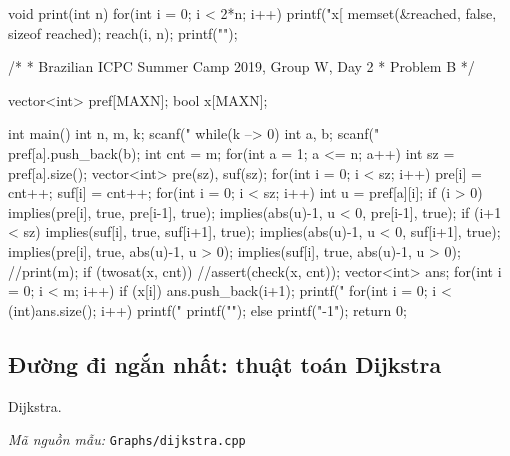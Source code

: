 \documentclass[11pt]{article}
\newcommand{\codepath}[1]{\par\noindent\textit{Mã nguồn mẫu:} \texttt{#1}\par}
\begin{document}
\begin{vncode}
void print(int n) {
	for(int i = 0; i < 2*n; i++) {
		printf("x[%
		memset(&reached, false, sizeof reached);
		reach(i, n);
		printf("\n");
	}
}

/*
 * Brazilian ICPC Summer Camp 2019, Group W, Day 2
 * Problem B
 */

vector<int> pref[MAXN];
bool x[MAXN];

int main() {
	int n, m, k;
	scanf("%
	while(k --> 0) {
		int a, b;
		scanf("%
		pref[a].push_back(b);
	}
	int cnt = m;
	for(int a = 1; a <= n; a++) {
		int sz = pref[a].size();
		vector<int> pre(sz), suf(sz);
		for(int i = 0; i < sz; i++) {
			pre[i] = cnt++; suf[i] = cnt++;
		}
		for(int i = 0; i < sz; i++) {
			int u = pref[a][i];
			if (i > 0) {
				implies(pre[i], true, pre[i-1], true);
				implies(abs(u)-1, u < 0, pre[i-1], true);
			}
			if (i+1 < sz) {
				implies(suf[i], true, suf[i+1], true);
				implies(abs(u)-1, u < 0, suf[i+1], true);
			}
			implies(pre[i], true, abs(u)-1, u > 0);
			implies(suf[i], true, abs(u)-1, u > 0);
		}
	}
	//print(m);
	if (twosat(x, cnt)) {
		//assert(check(x, cnt));
		vector<int> ans;
		for(int i = 0; i < m; i++) {
			if (x[i]) ans.push_back(i+1);
		}
		printf("%
		for(int i = 0; i < (int)ans.size(); i++) {
			printf("%
		}
		printf("\n");
	}
	else printf("-1\n");
	return 0;
}
\end{vncode}
\endgroup


\subsection{Đường đi ngắn nhất: thuật toán Dijkstra}

Dijkstra.

\codepath{Graphs/dijkstra.cpp}
\end{document}
